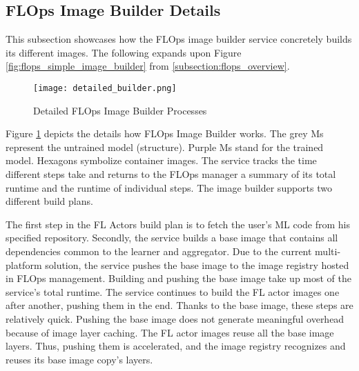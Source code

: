 \subsection{FLOps Image Builder Details}

This subsection showcases how the FLOps image builder service concretely builds its different images.
The following expands upon Figure \ref{fig:flops_simple_image_builder} from \ref{subsection:flops_overview}.

\begin{figure}[p]
    \begin{adjustwidth}{-0.1\paperwidth}{-0.1\paperwidth}
        \centering
        \texttt{[image: detailed\_builder.png]}
        \caption{Detailed FLOps Image Builder Processes}
        \label{fig:detailed_builder}
    \end{adjustwidth}
\end{figure}

Figure \ref{fig:detailed_builder} depicts the details how FLOps Image Builder works.
The grey Ms represent the untrained model (structure).
Purple Ms stand for the trained model.
Hexagons symbolize container images.
The service tracks the time different steps take and returns to the FLOps manager a summary of its total runtime and the runtime of individual steps.
The image builder supports two different build plans.

The first step in the FL Actors build plan is to fetch the user's ML code from his specified repository.
Secondly, the service builds a base image that contains all dependencies common to the learner and aggregator.
Due to the current multi-platform solution, the service pushes the base image to the image registry hosted in FLOps management.
Building and pushing the base image take up most of the service's total runtime.
The service continues to build the FL actor images one after another, pushing them in the end.
Thanks to the base image, these steps are relatively quick.
Pushing the base image does not generate meaningful overhead because of image layer caching.
The FL actor images reuse all the base image layers.
Thus, pushing them is accelerated, and the image registry recognizes and reuses its base image copy's layers.

